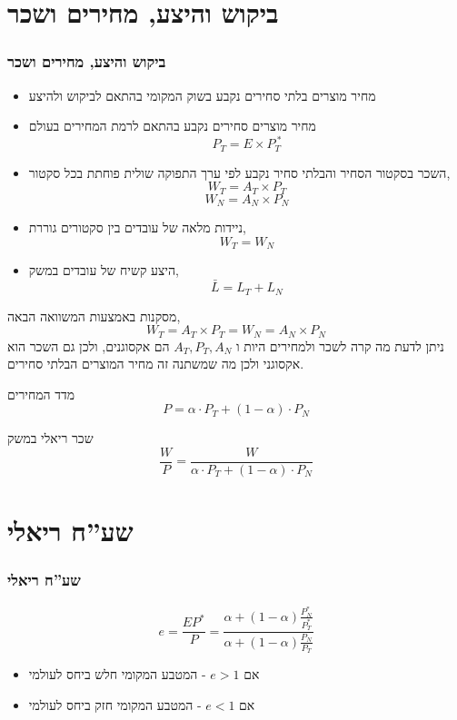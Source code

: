 \documentclass[usenames,dvipsnames]{beamer}
\begin{document}
\begin{RTL}
\section{ביקוש והיצע, מחירים ושכר}
\begin{frame}[allowframebreaks]
    \frametitle{ביקוש והיצע, מחירים ושכר}
    \begin{itemize}
        \item מחיר מוצרים בלתי סחירים נקבע בשוק המקומי בהתאם לביקוש ולהיצע
        \item מחיר מוצרים סחירים נקבע בהתאם לרמת המחירים בעולם
        $$P_T = E \times P_T^{\ *}$$
        \item השכר בסקטור הסחיר והבלתי סחיר נקבע לפי ערך התפוקה שולית פוחתת בכל סקטור,
        $$W_T = A_T \times P_T$$
        $$W_N = A_N \times P_N$$
        \item ניידות מלאה של עובדים בין סקטורים גוררת,
        $$W_T = W_N$$
        \item היצע קשיח של עובדים במשק, 
        $$\bar{L} = L_T + L_N$$
    \end{itemize}
    \framebreak
    \begin{block}{מסקנות}
        באמצעות המשוואה הבאה,
        $$
        W_T = A_T \times P_T = W_N = A_N \times P_N
        $$
        ניתן לדעת מה קרה לשכר ולמחירים היות ו $A_T, P_T, A_N$ הם אקסוגנים, ולכן גם השכר הוא אקסוגני ולכן מה שמשתנה זה מחיר המוצרים הבלתי סחירים. 
       \end{block}
       \begin{block}{מדד המחירים}
        $$P = \alpha \cdot P_T + \left(1- \alpha\right) \cdot P_N$$
       \end{block}
       \begin{block}{שכר ריאלי במשק}
        $$\frac{W}{P} = \frac{W}{\alpha \cdot P_T + \left(1- \alpha\right) \cdot P_N}$$
       \end{block}
\end{frame}

\section{שע''ח ריאלי}
\begin{frame}
    \frametitle{שע''ח ריאלי}
    $$
    e=\frac{E P^*}{P}=\frac{\alpha+(1-\alpha) \frac{P_N^*}{P_T^*}}{\alpha+(1-\alpha) \frac{P_N}{P_T}}
    $$
    
    \begin{itemize}
        \item אם $e > 1$ - המטבע המקומי חלש ביחס לעולמי
        \item אם $e < 1$ - המטבע המקומי חזק ביחס לעולמי
    \end{itemize}


\end{frame}
\end{RTL}
\end{document}
